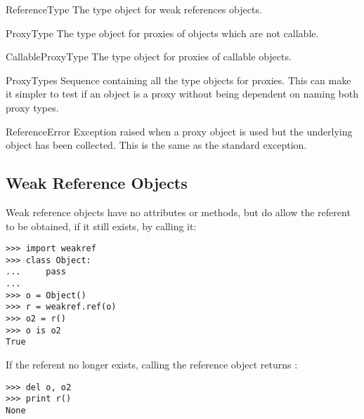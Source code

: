 \begin{datadesc}{ReferenceType}
  The type object for weak references objects.
\end{datadesc}

\begin{datadesc}{ProxyType}
  The type object for proxies of objects which are not callable.
\end{datadesc}

\begin{datadesc}{CallableProxyType}
  The type object for proxies of callable objects.
\end{datadesc}

\begin{datadesc}{ProxyTypes}
  Sequence containing all the type objects for proxies.  This can make
  it simpler to test if an object is a proxy without being dependent
  on naming both proxy types.
\end{datadesc}

\begin{excdesc}{ReferenceError}
  Exception raised when a proxy object is used but the underlying
  object has been collected.  This is the same as the standard
   exception.
\end{excdesc}


\begin{seealso}
\end{seealso}


\subsection{Weak Reference Objects
            \label{weakref-objects}}

Weak reference objects have no attributes or methods, but do allow the
referent to be obtained, if it still exists, by calling it:

\begin{verbatim}
>>> import weakref
>>> class Object:
...     pass
...
>>> o = Object()
>>> r = weakref.ref(o)
>>> o2 = r()
>>> o is o2
True
\end{verbatim}

If the referent no longer exists, calling the reference object returns
:

\begin{verbatim}
>>> del o, o2
>>> print r()
None
\end{verbatim}

